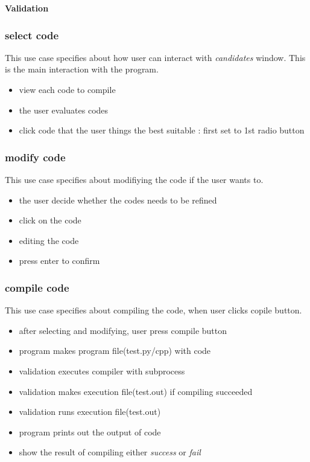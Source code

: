 \documentclass[conference]{IEEEtran}
\begin{document}
\textbf{Validation}

\subsubsection{select code}
This use case specifies about how user can interact with \textit{candidates} window. This is the main interaction with the program.
\begin{itemize}
  \item view each code to compile
  \item the user evaluates codes
  \item click code that the user things the best suitable : first set to 1st radio button
\end{itemize}
\textit{}


\subsubsection{modify code}
This use case specifies about modifiying the code if the user wants to.
\begin{itemize}
  \item the user decide whether the codes needs to be refined
  \item click on the code
  \item editing the code
  \item press enter to confirm
\end{itemize}
\textit{}


\subsubsection{compile code}
This use case specifies about compiling the code, when user clicks copile button.
\begin{itemize}
  \item after selecting and modifying, user press compile button
  \item program makes program file(test.py/cpp) with code
  \item validation executes compiler with subprocess
  \item validation makes execution file(test.out) if compiling succeeded
  \item validation runs execution file(test.out)
  \item program prints out the output of code
  \item show the result of compiling either \textit{success} or \textit{fail}
\end{itemize}
\textit{}
\end{document}

